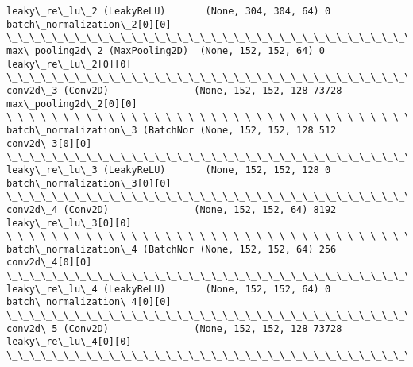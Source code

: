 \documentclass[11pt]{article}
\begin{document}
\begin{Verbatim}[commandchars=\\\{\}]
leaky\_re\_lu\_2 (LeakyReLU)       (None, 304, 304, 64) 0           batch\_normalization\_2[0][0]      
\_\_\_\_\_\_\_\_\_\_\_\_\_\_\_\_\_\_\_\_\_\_\_\_\_\_\_\_\_\_\_\_\_\_\_\_\_\_\_\_\_\_\_\_\_\_\_\_\_\_\_\_\_\_\_\_\_\_\_\_\_\_\_\_\_\_\_\_\_\_\_\_\_\_\_\_\_\_\_\_\_\_\_\_\_\_\_\_\_\_\_\_\_\_\_\_\_\_
max\_pooling2d\_2 (MaxPooling2D)  (None, 152, 152, 64) 0           leaky\_re\_lu\_2[0][0]              
\_\_\_\_\_\_\_\_\_\_\_\_\_\_\_\_\_\_\_\_\_\_\_\_\_\_\_\_\_\_\_\_\_\_\_\_\_\_\_\_\_\_\_\_\_\_\_\_\_\_\_\_\_\_\_\_\_\_\_\_\_\_\_\_\_\_\_\_\_\_\_\_\_\_\_\_\_\_\_\_\_\_\_\_\_\_\_\_\_\_\_\_\_\_\_\_\_\_
conv2d\_3 (Conv2D)               (None, 152, 152, 128 73728       max\_pooling2d\_2[0][0]            
\_\_\_\_\_\_\_\_\_\_\_\_\_\_\_\_\_\_\_\_\_\_\_\_\_\_\_\_\_\_\_\_\_\_\_\_\_\_\_\_\_\_\_\_\_\_\_\_\_\_\_\_\_\_\_\_\_\_\_\_\_\_\_\_\_\_\_\_\_\_\_\_\_\_\_\_\_\_\_\_\_\_\_\_\_\_\_\_\_\_\_\_\_\_\_\_\_\_
batch\_normalization\_3 (BatchNor (None, 152, 152, 128 512         conv2d\_3[0][0]                   
\_\_\_\_\_\_\_\_\_\_\_\_\_\_\_\_\_\_\_\_\_\_\_\_\_\_\_\_\_\_\_\_\_\_\_\_\_\_\_\_\_\_\_\_\_\_\_\_\_\_\_\_\_\_\_\_\_\_\_\_\_\_\_\_\_\_\_\_\_\_\_\_\_\_\_\_\_\_\_\_\_\_\_\_\_\_\_\_\_\_\_\_\_\_\_\_\_\_
leaky\_re\_lu\_3 (LeakyReLU)       (None, 152, 152, 128 0           batch\_normalization\_3[0][0]      
\_\_\_\_\_\_\_\_\_\_\_\_\_\_\_\_\_\_\_\_\_\_\_\_\_\_\_\_\_\_\_\_\_\_\_\_\_\_\_\_\_\_\_\_\_\_\_\_\_\_\_\_\_\_\_\_\_\_\_\_\_\_\_\_\_\_\_\_\_\_\_\_\_\_\_\_\_\_\_\_\_\_\_\_\_\_\_\_\_\_\_\_\_\_\_\_\_\_
conv2d\_4 (Conv2D)               (None, 152, 152, 64) 8192        leaky\_re\_lu\_3[0][0]              
\_\_\_\_\_\_\_\_\_\_\_\_\_\_\_\_\_\_\_\_\_\_\_\_\_\_\_\_\_\_\_\_\_\_\_\_\_\_\_\_\_\_\_\_\_\_\_\_\_\_\_\_\_\_\_\_\_\_\_\_\_\_\_\_\_\_\_\_\_\_\_\_\_\_\_\_\_\_\_\_\_\_\_\_\_\_\_\_\_\_\_\_\_\_\_\_\_\_
batch\_normalization\_4 (BatchNor (None, 152, 152, 64) 256         conv2d\_4[0][0]                   
\_\_\_\_\_\_\_\_\_\_\_\_\_\_\_\_\_\_\_\_\_\_\_\_\_\_\_\_\_\_\_\_\_\_\_\_\_\_\_\_\_\_\_\_\_\_\_\_\_\_\_\_\_\_\_\_\_\_\_\_\_\_\_\_\_\_\_\_\_\_\_\_\_\_\_\_\_\_\_\_\_\_\_\_\_\_\_\_\_\_\_\_\_\_\_\_\_\_
leaky\_re\_lu\_4 (LeakyReLU)       (None, 152, 152, 64) 0           batch\_normalization\_4[0][0]      
\_\_\_\_\_\_\_\_\_\_\_\_\_\_\_\_\_\_\_\_\_\_\_\_\_\_\_\_\_\_\_\_\_\_\_\_\_\_\_\_\_\_\_\_\_\_\_\_\_\_\_\_\_\_\_\_\_\_\_\_\_\_\_\_\_\_\_\_\_\_\_\_\_\_\_\_\_\_\_\_\_\_\_\_\_\_\_\_\_\_\_\_\_\_\_\_\_\_
conv2d\_5 (Conv2D)               (None, 152, 152, 128 73728       leaky\_re\_lu\_4[0][0]              
\_\_\_\_\_\_\_\_\_\_\_\_\_\_\_\_\_\_\_\_\_\_\_\_\_\_\_\_\_\_\_\_\_\_\_\_\_\_\_\_\_\_\_\_\_\_\_\_\_\_\_\_\_\_\_\_\_\_\_\_\_\_\_\_\_\_\_\_\_\_\_\_\_\_\_\_\_\_\_\_\_\_\_\_\_\_\_\_\_\_\_\_\_\_\_\_\_\_

\end{Verbatim}
\end{document}
